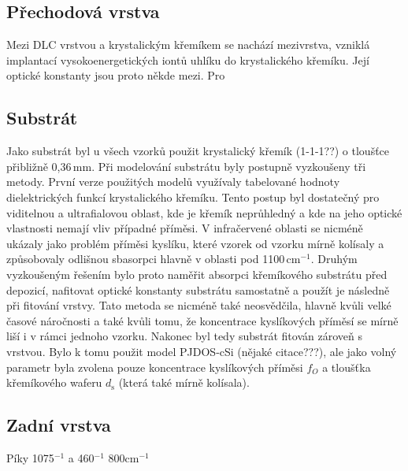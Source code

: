 \subsection{Přechodová vrstva}
Mezi DLC vrstvou a krystalickým křemíkem se nachází mezivrstva, vzniklá implantací vysokoenergetických iontů uhlíku do krystalického křemíku. Její optické konstanty jsou proto někde mezi. Pro  

\subsection{Substrát}
Jako substrát byl u všech vzorků použit krystalický křemík (1-1-1??) o tloušťce přibližně 0,36\,mm. Při modelování substrátu byly postupně vyzkoušeny tři metody. První verze použitých modelů využívaly tabelované hodnoty dielektrických funkcí krystalického křemíku. Tento postup byl dostatečný pro viditelnou a ultrafialovou oblast, kde je křemík neprůhledný a kde na jeho optické vlastnosti nemají vliv případné příměsi. V infračervené oblasti se nicméně ukázaly jako problém příměsi kyslíku, které vzorek od vzorku mírně kolísaly a způsobovaly odlišnou sbasorpci hlavně v oblasti pod 1100\,cm$^{-1}$. Druhým vyzkoušeným řešením bylo proto naměřit absorpci křemíkového substrátu před depozicí, nafitovat optické konstanty substrátu samostatně a použít je následně při fitování vrstvy. Tato metoda se nicméně také neosvědčila, hlavně kvůli velké časové náročnosti a také kvůli tomu, že koncentrace kyslíkových příměsí se mírně liší i v rámci jednoho vzorku.
Nakonec byl tedy substrát fitován zároveň s vrstvou. Bylo k tomu použit model PJDOS-cSi \cite{}(nějaké citace???), ale jako volný parametr byla zvolena pouze koncentrace kyslíkových příměsi $f_O$ a tloušťka křemíkového waferu $d_\mathrm{s}$ (která také mírně kolísala).  

\subsection{Zadní vrstva}
Píky 1075$^{-1}$ a 460$^{-1}$ 800cm$^{-1}$

\cleardoublepage
